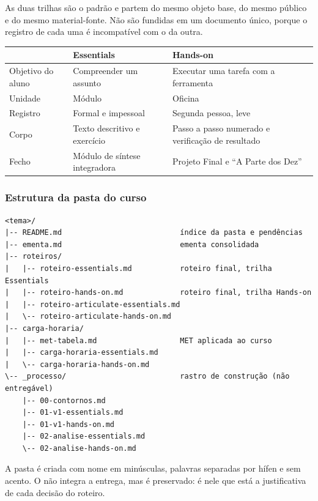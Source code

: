 \documentclass[12pt,a4paper]{article}
\begin{document}
As duas trilhas são o padrão e partem do mesmo objeto base, do mesmo público e do mesmo material-fonte. Não são fundidas em um documento único, porque o registro de cada uma é incompatível com o da outra.

\begingroup\small
\renewcommand{\arraystretch}{1.3}
\begin{longtable}{@{}L{0.24\textwidth}L{0.34\textwidth}L{0.34\textwidth}@{}}
\toprule
 & \textbf{Essentials} & \textbf{Hands-on} \\
\midrule
\endhead
\bottomrule
\endlastfoot
Objetivo do aluno & Compreender um assunto & Executar uma tarefa com a ferramenta \\
Unidade & Módulo & Oficina \\
Registro & Formal e impessoal & Segunda pessoa, leve \\
Corpo & Texto descritivo e exercício & Passo a passo numerado e verificação de resultado \\
Fecho & Módulo de síntese integradora & Projeto Final e ``A Parte dos Dez'' \\
\end{longtable}
\endgroup

\subsubsection*{Estrutura da pasta do curso}

\begingroup\small{}
\begin{verbatim}
<tema>/
|-- README.md                           índice da pasta e pendências
|-- ementa.md                           ementa consolidada
|-- roteiros/
|   |-- roteiro-essentials.md           roteiro final, trilha Essentials
|   |-- roteiro-hands-on.md             roteiro final, trilha Hands-on
|   |-- roteiro-articulate-essentials.md
|   \-- roteiro-articulate-hands-on.md
|-- carga-horaria/
|   |-- met-tabela.md                   MET aplicada ao curso
|   |-- carga-horaria-essentials.md
|   \-- carga-horaria-hands-on.md
\-- _processo/                          rastro de construção (não entregável)
    |-- 00-contornos.md
    |-- 01-v1-essentials.md
    |-- 01-v1-hands-on.md
    |-- 02-analise-essentials.md
    \-- 02-analise-hands-on.md
\end{verbatim}
\endgroup

A pasta é criada com nome em minúsculas, palavras separadas por hífen e sem acento. O  não integra a entrega, mas é preservado: é nele que está a justificativa de cada decisão do roteiro.
\end{document}
